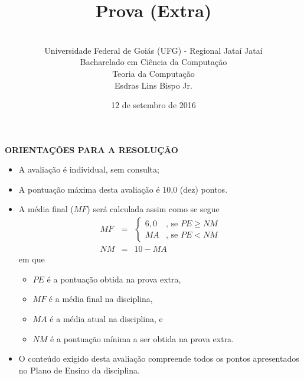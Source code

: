 \documentclass[12pt,a4paper,oneside]{article}
\author{\\Universidade Federal de Goiás (UFG) - Regional Jataí Jataí\\Bacharelado em Ciência da Computação \\Teoria da Computação \\Esdras Lins Bispo Jr.}
\date{12 de setembro de 2016}
\title{\sc \huge Prova (Extra)}
\begin{document}
\maketitle

{\bf ORIENTAÇÕES PARA A RESOLUÇÃO}
{ \footnotesize
\begin{itemize}
	\item A avaliação é individual, sem consulta;
	\item A pontuação máxima desta avaliação é 10,0 (dez) pontos.
	\item A média final ($MF$) será calculada assim como se segue
	\begin{eqnarray}
		MF & = & \left\{
					\begin{array}{ll}
						6,0  & \mbox{, se } PE \geq NM \\
						MA & \mbox{, se } PE < NM
					\end{array}
				\right. \nonumber \\
		NM & = & 10 - MA \nonumber
	\end{eqnarray}
	em que 
	\begin{itemize}
		\item $PE$ é a pontuação obtida na prova extra,
		\item $MF$ é a média final na disciplina,
		\item $MA$ é a média atual na disciplina, e
		\item $NM$ é a pontuação mínima a ser obtida na prova extra.
	\end{itemize}
	\item O conteúdo exigido desta avaliação compreende todos os pontos apresentados no Plano de Ensino da disciplina.
\end{itemize}

\begin{center}
\end{center}
}
\newpage
\end{document}
